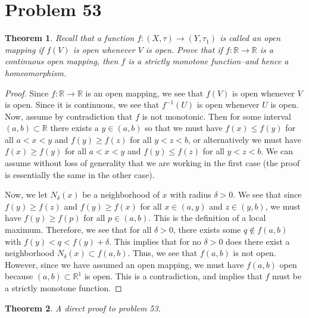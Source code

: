 \documentclass[psamsfonts]{amsart}
\newtheorem{thm}{Theorem}[section]
\theoremstyle{definition}
\theoremstyle{remark}
\numberwithin{equation}{section}
\begin{document}
\section{Problem 53}

\begin{thm}
Recall that a function $f:(X,\tau) \to (Y, \tau_1)$ is called an open mapping if $f(V)$ is open whenever $V$ is open. Prove that if $f: \mathbb{R} \to \mathbb{R}$ is a continuous open mapping, then $f$ is a strictly monotone function--and hence a homeomorphism.
\end{thm}

\begin{proof}
Since $f: \mathbb{R} \to \mathbb{R}$ is an open mapping, we see that $f(V)$ is open whenever $V$ is open. Since it is continuous, we see that $f^{-1}(U)$ is open whenever $U$ is open. Now, assume by contradiction that $f$ is not monotonic. Then for some interval $(a,b) \subset \mathbb{R}$ there exists a $y \in (a,b)$ so that we must have $f(x) \leq f(y)$ for all $a < x < y$ and $f(y) \geq f(z)$ for all $y < z < b$, or alternatively we must have $f(x) \geq f(y)$ for all $a < x < y$ and $f(y) \leq f(z)$ for all $y < z < b$. We can assume without loss of generality that we are working in the first case (the proof is essentially the same in the other case).

Now, we let $N_{\delta} (x)$ be a neighborhood of $x$ with radius $\delta > 0$. We see that since $f(y) \geq f(z)$ and $f(y) \geq f(x)$ for all $x \in (a,y)$ and $z \in (y,b)$, we must have $f(y) \geq f(p)$ for all $p \in (a,b)$. This is the definition of a local maximum. Therefore, we see that for all $\delta > 0$, there exists some $q \notin f(a,b)$ with $f(y) < q < f(y) + \delta$. This implies that for no $\delta > 0$ does there exist a neighborhood $N_{\delta} (x) \subset f(a,b)$. Thus, we see that $f(a,b)$ is not open. However, since we have assumed an open mapping, we must have $f(a,b)$ open because $(a,b) \subset \mathbb{R}^1$ is open. This is a contradiction, and implies that $f$ must be a strictly monotone function.
\end{proof}

\begin{thm}
A direct proof to problem 53.
\end{thm}
\end{document}
